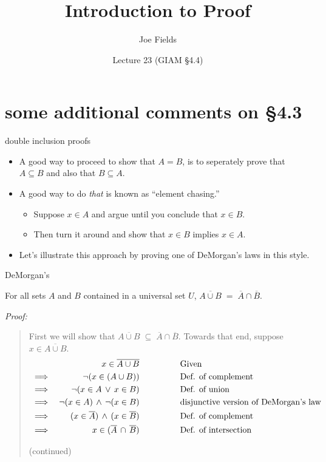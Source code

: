 \documentclass[handout,landscape]{beamer}
\author{Joe Fields}
\title{Introduction to Proof}
\date{Lecture 23 (GIAM \S 4.4) \newline }
\institute[SCSU]{ {\tt fieldsj1@southernct.edu} }
\begin{document}
\begin{frame}[plain]
  \titlepage
\end{frame}

\section{some additional comments on \S 4.3}

\begin{frame}{double inclusion proofs}
\begin{itemize}
\item A good way to proceed to show that $A=B$, is to seperately prove that $A \subseteq B$ and also that $B \subseteq A$.  \pause
\item A good way to do {\em that} is known as ``element chasing.'' \pause
\begin{itemize}
\item Suppose $x \in A$ and argue until you conclude that $x \in B$. \pause 
\item Then turn it around and show that $x \in B$ implies $x \in A$.
\end{itemize}
\item Let's illustrate this approach by proving one of DeMorgan's laws in this style.
\end{itemize}
\end{frame}

\begin{frame}{DeMorgan's}
\begin{thm*}
For all sets $A$ and $B$ contained in a universal set $U$,
$ \overline{A \cup B} \; = \; \overline{A} \cap \overline{B}. $
\end{thm*}
{\em Proof:}
\begin{quote}
First we will show that $\overline{A \cup B} \; \subseteq \; \overline{A} \cap \overline{B} $.\newline
Towards that end, suppose $x \in \overline{A \cup B}$. 
\begin{align*}
 &      & x \in \overline{A \cup B} \rule{48pt}{0pt} & \mbox{Given} & \\
 & \implies & \lnot (x \in (A \cup B)) \rule{48pt}{0pt} & \mbox{Def. of complement} & \\
 & \implies & \lnot (x \in A \, \lor \, x \in B) \rule{48pt}{0pt} & \mbox{Def. of union} & \\
 & \implies & \lnot (x \in A) \, \land  \, \lnot (x \in B) \rule{48pt}{0pt} & \mbox{disjunctive version of DeMorgan's law } & \\
 & \implies &  (x \in \overline{A}) \, \land  \, (x \in \overline{B}) \rule{48pt}{0pt} & \mbox{Def. of complement} & \\
 & \implies &  x \in ( \overline{A} \, \cap \, \overline{B}) \rule{48pt}{0pt} & \mbox{Def. of intersection} & \\
\end{align*}

(continued)

\end{quote}
\end{frame}
\end{document}
